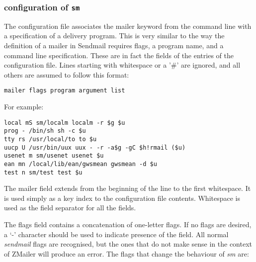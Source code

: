 \subsubsection{configuration of \tt sm}
\label{smconfig}

The configuration file associates the mailer keyword from
the command line with a specification of a delivery program. 
This is very similar to the way the definition of a
mailer in Sendmail requires flags, a program name, and a
command line specification. These are in fact the fields
of the entries of the configuration file. Lines starting
with whitespace or a '\#' are ignored, and all others are
assumed to follow this format:

\begin{verbatim}
mailer flags program argument list
\end{verbatim}

For example:
\begin{verbatim}
local mS sm/localm localm -r $g $u
prog - /bin/sh sh -c $u
tty rs /usr/local/to to $u
uucp U /usr/bin/uux uux - -r -a$g -gC $h!rmail ($u)
usenet m sm/usenet usenet $u
ean mn /local/lib/ean/gwsmean gwsmean -d $u
test n sm/test test $u
\end{verbatim}


The mailer field extends from the beginning of the line to
the first whitespace. It is used simply as a key index to
the configuration file contents. Whitespace is used as
the field separator for all the fields.

The flags field contains a concatenation of one-letter
flags. If no flags are desired, a `-' character should be
used to indicate presence of the field. All normal {\em sendmail\/} flags 
are recognised, but the ones that do not make
sense in the context of ZMailer will produce an error.
The flags that change the behaviour of {\em sm\/} are:

